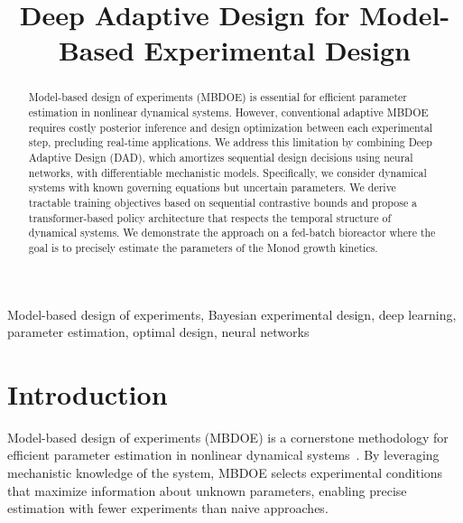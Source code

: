 \documentclass[conference]{IEEEtran}
\begin{document}
\title{Deep Adaptive Design for Model-Based Experimental Design\\
}

\author{
}

\maketitle

\begin{abstract}
Model-based design of experiments (MBDOE) is essential for efficient parameter estimation in nonlinear dynamical systems. However, conventional adaptive MBDOE requires costly posterior inference and design optimization between each experimental step, precluding real-time applications. We address this limitation by combining Deep Adaptive Design (DAD), which amortizes sequential design decisions using neural networks, with differentiable mechanistic models. Specifically, we consider dynamical systems with known governing equations but uncertain parameters. We derive tractable training objectives based on sequential contrastive bounds and propose a transformer-based policy architecture that respects the temporal structure of dynamical systems. We demonstrate the approach on a fed-batch bioreactor where the goal is to precisely estimate the parameters of the Monod growth kinetics.
\end{abstract}

\begin{IEEEkeywords}
Model-based design of experiments, Bayesian experimental design, deep learning, parameter estimation, optimal design, neural networks
\end{IEEEkeywords}

\section{Introduction}
Model-based design of experiments (MBDOE) is a cornerstone methodology for efficient parameter estimation in nonlinear dynamical systems~\citep{franceschini,walter1997}. By leveraging mechanistic knowledge of the system, MBDOE selects experimental conditions that maximize information about unknown parameters, enabling precise estimation with fewer experiments than naive approaches.
\end{document}

